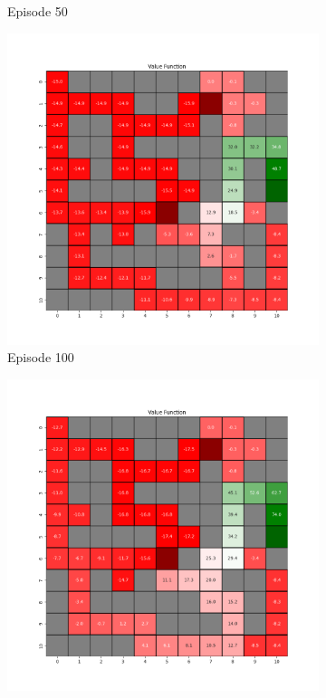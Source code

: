 \documentclass{assignment}
\begin{document}
\begin{figure}[H]
\begin{subfigure}{0.3\textwidth}
    \caption{Episode 50}
    \end{subfigure}\hfill
    \begin{subfigure}{0.3\textwidth}
        \includegraphics[width=\textwidth]{figures/value_q/epsilon_sweep/value_function_alpha_0.1_gamma_0.95_epsilon_0.0_iteration_100.png}
    \caption{Episode 100}
    \end{subfigure}
    \begin{subfigure}{0.3\textwidth}
        \includegraphics[width=\textwidth]{figures/value_q/epsilon_sweep/value_function_alpha_0.1_gamma_0.95_epsilon_0.0_iteration_1000.png}

\end{subfigure}
\end{figure}
\end{document}

